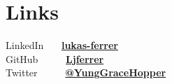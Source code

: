 \documentclass[letterpaper]{deedy-resume} %
\begin{document}
\begin{minipage}[t]{0.33\textwidth}
\sectionspace %


\section{Links} 
\location{}     %
{LinkedIn \ \ \ \href{https://www.linkedin.com/in/lukas-ferrer-9596a410b}{\bf lukas-ferrer}} \\
{GitHub \ \ \ \ \  \href{https://github.com/Ljferrer}{\bf Ljferrer}} \\
{Twitter \ \ \ \ \ \href{https://twitter.com/YungGraceHopper}{\bf @YungGraceHopper}}

\sectionspace %


\end{minipage} %
\hfill
%
%
\end{document}

